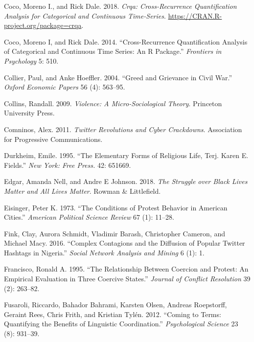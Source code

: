 \documentclass[english,man]{apa6}
\begin{document}
\leavevmode\hypertarget{ref-R-crqa}{}%
Coco, Moreno I., and Rick Dale. 2018. \emph{Crqa: Cross-Recurrence Quantification Analysis for Categorical and Continuous Time-Series}. \url{https://CRAN.R-project.org/package=crqa}.

\leavevmode\hypertarget{ref-coco2014cross}{}%
Coco, Moreno I, and Rick Dale. 2014. ``Cross-Recurrence Quantification Analysis of Categorical and Continuous Time Series: An R Package.'' \emph{Frontiers in Psychology} 5: 510.

\leavevmode\hypertarget{ref-collier2004greed}{}%
Collier, Paul, and Anke Hoeffler. 2004. ``Greed and Grievance in Civil War.'' \emph{Oxford Economic Papers} 56 (4): 563--95.

\leavevmode\hypertarget{ref-collins2009violence}{}%
Collins, Randall. 2009. \emph{Violence: A Micro-Sociological Theory}. Princeton University Press.

\leavevmode\hypertarget{ref-comninos2011twitter}{}%
Comninos, Alex. 2011. \emph{Twitter Revolutions and Cyber Crackdowns}. Association for Progressive Communications.

\leavevmode\hypertarget{ref-durkheim1995elementary}{}%
Durkheim, Emile. 1995. ``The Elementary Forms of Religious Life, Terj. Karen E. Fields.'' \emph{New York: Free Press.} 42: 651669.

\leavevmode\hypertarget{ref-edgar2018struggle}{}%
Edgar, Amanda Nell, and Andre E Johnson. 2018. \emph{The Struggle over Black Lives Matter and All Lives Matter}. Rowman \& Littlefield.

\leavevmode\hypertarget{ref-eisinger1973conditions}{}%
Eisinger, Peter K. 1973. ``The Conditions of Protest Behavior in American Cities.'' \emph{American Political Science Review} 67 (1): 11--28.

\leavevmode\hypertarget{ref-fink2016complex}{}%
Fink, Clay, Aurora Schmidt, Vladimir Barash, Christopher Cameron, and Michael Macy. 2016. ``Complex Contagions and the Diffusion of Popular Twitter Hashtags in Nigeria.'' \emph{Social Network Analysis and Mining} 6 (1): 1.

\leavevmode\hypertarget{ref-francisco1995relationship}{}%
Francisco, Ronald A. 1995. ``The Relationship Between Coercion and Protest: An Empirical Evaluation in Three Coercive States.'' \emph{Journal of Conflict Resolution} 39 (2): 263--82.

\leavevmode\hypertarget{ref-fusaroli2012coming}{}%
Fusaroli, Riccardo, Bahador Bahrami, Karsten Olsen, Andreas Roepstorff, Geraint Rees, Chris Frith, and Kristian Tylén. 2012. ``Coming to Terms: Quantifying the Benefits of Linguistic Coordination.'' \emph{Psychological Science} 23 (8): 931--39.
\end{document}
